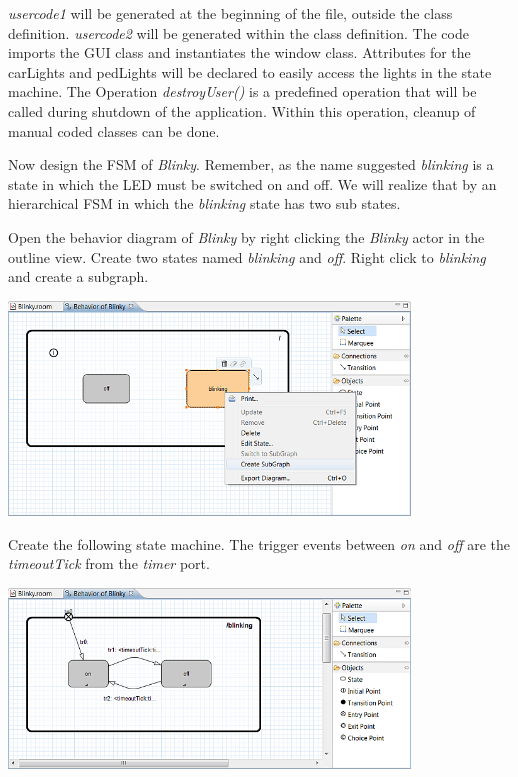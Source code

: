 \textit{usercode1} will be generated at the beginning of the file, outside the class definition. \textit{usercode2} will be generated within the class definition. The code imports the GUI class and instantiates the window class. Attributes for the carLights and pedLights will be declared to easily access the lights in the state machine.
The Operation \textit{destroyUser()} is a predefined operation that will be called during shutdown of the application. Within this operation, cleanup of manual coded classes can be done.
 
Now design the FSM of \textit{Blinky}. Remember, as the name suggested \textit{blinking} is a state in which the LED must be switched on and off. We will realize that by an hierarchical FSM in which the \textit{blinking} state has two sub states.

Open the behavior diagram of \textit{Blinky} by right clicking the \textit{Blinky} actor in the outline view. Create two states named \textit{blinking} and \textit{off}. Right click to \textit{blinking} and create a subgraph.

\includegraphics[width=0.8\textwidth]{images/020-Blinky13.png}

Create the following state machine. The trigger events between \textit{on} and \textit{off} are the \textit{timeoutTick} from the \textit{timer} port. 

\includegraphics[width=0.8\textwidth]{images/020-Blinky14.png}

